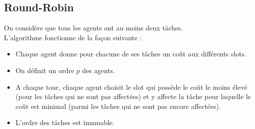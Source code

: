 \documentclass[12pt]{article}
\theoremstyle{definition}
\begin{document}
\subsection{Round-Robin}
\noindent
On considère que tous les agents ont au moins deux tâches.\\
L'algorithme fonctionne de la façon suivante :
\begin{itemize}
	\item Chaque agent donne pour chacune de ses tâches un coût aux différents slots.
	\item On définit un ordre $p$ des agents.
	\item A chaque tour, chaque agent choisit le slot qui possède le coût le moins élevé (pour les tâches qui ne sont pas affectées) et y affecte la tâche pour laquelle le coût est minimal (parmi les tâches qui ne sont pas encore affectées). 
	\item L'ordre des tâches est immuable.
\end{itemize}
\end{document}
